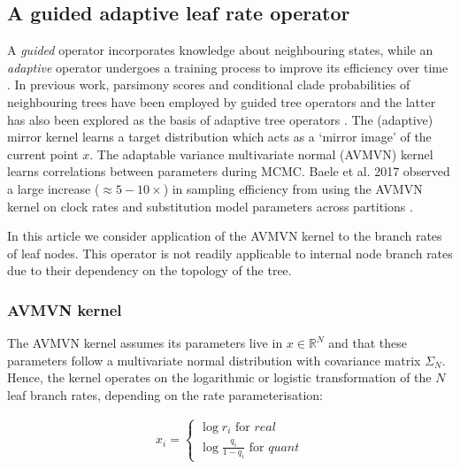 \documentclass[10pt,letterpaper]{article}
\begin{document}
\subsection*{A guided adaptive leaf rate operator}


A \textit{guided} operator incorporates knowledge about neighbouring states, while an \textit{adaptive} operator undergoes a training process to improve its efficiency over time \cite{roberts2007coupling}. In previous work, parsimony scores and conditional clade probabilities of neighbouring trees have been employed by guided tree operators \cite{hohna2012guided,zhang2019using,meyer2019adaptive} and the latter has also been explored as the basis of  adaptive tree operators \cite{hohna2012guided,meyer2019adaptive}. The (adaptive) mirror kernel \cite{thawornwattana2018designing} learns a target distribution which acts as a `mirror image' of the current point $x$.  The adaptable variance multivariate normal (AVMVN) kernel \cite{baele2017adaptive,suchard2018bayesian} learns correlations between parameters during MCMC. Baele et al. 2017  observed a large increase ($\approx 5-10 \times$) in sampling efficiency from using the AVMVN kernel on clock rates and substitution model parameters across partitions \cite{baele2017adaptive}.  


In this article we consider application of the AVMVN kernel to the branch rates of leaf nodes. This operator is not readily applicable to internal node branch rates due to their dependency on the topology of the tree.  




\subsubsection*{AVMVN kernel}
\label{AVMVN_sect}

The AVMVN kernel assumes its parameters live in $x \in \mathbb{R}^N$ and that these parameters follow a multivariate normal distribution with covariance matrix $\Sigma_N$. Hence, the kernel operates on the logarithmic or logistic transformation of the $N$ leaf branch rates, depending on the rate parameterisation:

\begin{align}
	x_i = \begin{cases} \log r_i \text{ for } \textit{real} \\
						\log \frac{q_i}{1 - q_i} \text{ for } \textit{quant}  \end{cases}
\end{align}
\end{document}
